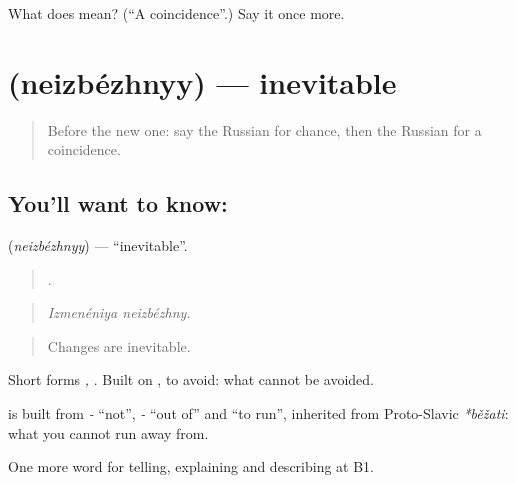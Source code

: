 \begin{tcolorbox}[breakable,colback=teal!4,colframe=teal!35!black,title={Before you move on}]
What does  mean? (\textquotedblleft{}A coincidence\textquotedblright{}.) Say it once more.
\end{tcolorbox}
\section[\texorpdfstring{\ru{неизбежный} (neizbézhnyy)}{неизбежный (neizbézhnyy)}]{ (neizbézhnyy) — inevitable}

\label{lesson:RU-C355-neizbezhnyy}



\begin{quote}
Before the new one: say the Russian for chance, then the Russian for a coincidence.
\end{quote}

\subsection*{You'll want to know: }
\textbf{} (\emph{neizbézhnyy}) — \textquotedblleft{}inevitable\textquotedblright{}.

\begin{quote}
 .
\end{quote}

\begin{quote}
\emph{Izmenéniya neizbézhny.}
\end{quote}

\begin{quote}
Changes are inevitable.
\end{quote}

Short forms \emph{, }. Built on \emph{}, to avoid: what cannot be avoided.

\begin{cousinweb}
\textbf{} is built from \emph{-} \textquotedblleft{}not\textquotedblright{}, \emph{-} \textquotedblleft{}out of\textquotedblright{} and \emph{} \textquotedblleft{}to run\textquotedblright{}, inherited from Proto-Slavic \emph{*běžati}: what you cannot run away from.
\end{cousinweb}

\begin{grammarlens}[title={What you've built}]
One more word for telling, explaining and describing at B1.
\end{grammarlens}

